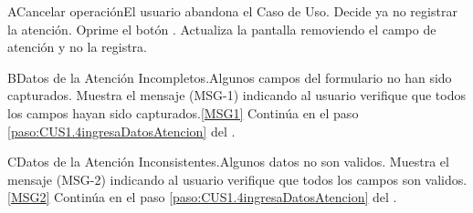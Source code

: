 	\begin{UCtrayectoriaA}{A}{Cancelar operación}{El usuario abandona el Caso de Uso.}
			\UCpaso[\UCactor] Decide ya no registrar la atención.
			\UCpaso[\UCactor] Oprime el botón .
			\UCpaso Actualiza la pantalla removiendo el campo de atención y no la registra. 
	\end{UCtrayectoriaA}

	\begin{UCtrayectoriaA}{B}{Datos de la Atención Incompletos.}{Algunos campos del formulario no han sido capturados.}
			\UCpaso Muestra el mensaje (MSG-1) indicando al usuario verifique que todos los campos hayan sido capturados.\ref{MSG1}
			\UCpaso Continúa en el paso \ref{paso:CUS1.4ingresaDatosAtencion} del .
	\end{UCtrayectoriaA}

	\begin{UCtrayectoriaA}{C}{Datos de la Atención Inconsistentes.}{Algunos datos no son validos.}
			\UCpaso Muestra el mensaje (MSG-2) indicando al usuario verifique que todos los campos son validos.\ref{MSG2}
			\UCpaso Continúa en el paso \ref{paso:CUS1.4ingresaDatosAtencion} del .
	\end{UCtrayectoriaA}